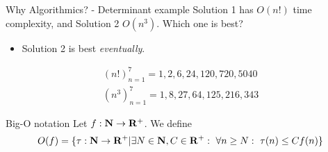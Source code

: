 \documentclass{beamer}
\begin{document}
%

\begin{frame}{Why Algorithmics? - Determinant example}
	Solution 1 has $O(n!)$ time complexity, and Solution 2 $O(n^3)$. Which one
	is best?

	\begin{itemize}
		\item Solution 2 is best \emph{eventually}.
	\end{itemize}

	\begin{eqnarray*}
		(n!)_{n=1}^{7} = 1, 2, 6, 24, 120, 720, 5040\\
		(n^3)_{n=1}^{7} = 1, 8, 27, 64, 125, 216, 343
	\end{eqnarray*}
\end{frame}

%

\begin{frame}{Big-O notation}
	Let $f : \mathbf{N} \to \mathbf{R}^+$. We define
	\begin{equation*}
		O(f) = \{\tau : \mathbf{N} \to \mathbf{R}^+ | \exists N \in \mathbf{N}, C \in \mathbf{R}^+ : \ \forall n \geq N : \ \tau(n) \leq C f(n)\}
	\end{equation*}
\end{frame}
\end{document}

